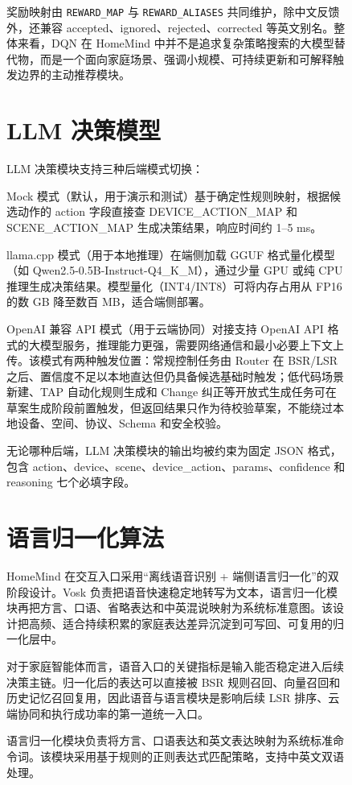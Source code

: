 \documentclass[12pt,a4paper,oneside]{ctexrep}
\begin{document}
\begin{figure}[H]
奖励映射由 \texttt{REWARD\_MAP} 与 \texttt{REWARD\_ALIASES} 共同维护，除中文反馈外，还兼容 accepted、ignored、rejected、corrected 等英文别名。整体来看，DQN 在 HomeMind 中并不是追求复杂策略搜索的大模型替代物，而是一个面向家庭场景、强调小规模、可持续更新和可解释触发边界的主动推荐模块。

\section{LLM 决策模型}

LLM 决策模块支持三种后端模式切换：

Mock 模式（默认，用于演示和测试）基于确定性规则映射，根据候选动作的 action 字段直接查 DEVICE\_ACTION\_MAP 和 SCENE\_ACTION\_MAP 生成决策结果，响应时间约 1--5 ms。

llama.cpp 模式（用于本地推理）在端侧加载 GGUF 格式量化模型（如 Qwen2.5-0.5B-Instruct-Q4\_K\_M），通过少量 GPU 或纯 CPU 推理生成决策结果。模型量化（INT4/INT8）可将内存占用从 FP16 的数 GB 降至数百 MB，适合端侧部署。

OpenAI 兼容 API 模式（用于云端协同）对接支持 OpenAI API 格式的大模型服务，推理能力更强，需要网络通信和最小必要上下文上传。该模式有两种触发位置：常规控制任务由 Router 在 BSR/LSR 之后、置信度不足以本地直达但仍具备候选基础时触发；低代码场景新建、TAP 自动化规则生成和 Change 纠正等开放式生成任务可在草案生成阶段前置触发，但返回结果只作为待校验草案，不能绕过本地设备、空间、协议、Schema 和安全校验。

无论哪种后端，LLM 决策模块的输出均被约束为固定 JSON 格式，包含 action、device、scene、device\_action、params、confidence 和 reasoning 七个必填字段。

\section{语言归一化算法}

HomeMind 在交互入口采用“离线语音识别 + 端侧语言归一化”的双阶段设计。Vosk 负责把语音快速稳定地转写为文本，语言归一化模块再把方言、口语、省略表达和中英混说映射为系统标准意图。该设计把高频、适合持续积累的家庭表达差异沉淀到可写回、可复用的归一化层中。

对于家庭智能体而言，语音入口的关键指标是输入能否稳定进入后续决策主链。归一化后的表达可以直接被 BSR 规则召回、向量召回和历史记忆召回复用，因此语音与语言模块是影响后续 LSR 排序、云端协同和执行成功率的第一道统一入口。

语言归一化模块负责将方言、口语表达和英文表达映射为系统标准命令词。该模块采用基于规则的正则表达式匹配策略，支持中英文双语处理。


\end{figure}
\end{document}
